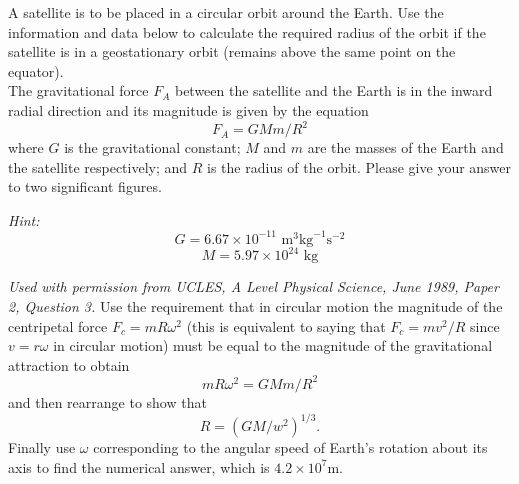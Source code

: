 
\begin{problem}[A1989PSIIQ3l] 
{A satellite is to be placed in a circular orbit around the Earth. Use the information and data below to calculate the required radius of the orbit if the satellite is in a geostationary orbit (remains above the same point on the equator). \\ The gravitational force $F_A$ between the satellite and the Earth is in the inward radial direction and its magnitude is given by the equation 
\begin{equation*}
F_A=GMm/R^2
\end{equation*}
where $G$ is the gravitational constant; $M$ and $m$ are the masses of the Earth and the satellite respectively; and $R$ is the radius of the orbit. Please give your answer to two significant figures.

\emph{Hint:} 
\begin{equation*}
G=6.67\times 10^{-11} \textrm{ m}^3\textrm{kg}^{-1}\textrm{s}^{-2}
\end{equation*}
\begin{equation*}
M=5.97\times 10^{24} \textrm{ kg}
\end{equation*}
} {\textit{Used with permission from UCLES, A Level Physical Science, June 1989, Paper 2, Question 3.}
}{
Use the requirement that in circular motion the magnitude of the centripetal force $F_c=mR\omega^2$ (this is equivalent to saying that $F_c=mv^2/R$ since $v=r\omega$ in circular motion) must be equal to the magnitude of the gravitational attraction to obtain \begin{equation*}
mR\omega^2=GMm/R^2
\end{equation*}
 and then rearrange to show that
 \begin{equation*}
{R={(GM/w^2)}^{1/3}.}
\end{equation*} 
Finally use $\omega$ corresponding to the angular speed of Earth's rotation about its axis to find the numerical answer, which is $4.2\times 10^7$m.}
\end{problem}